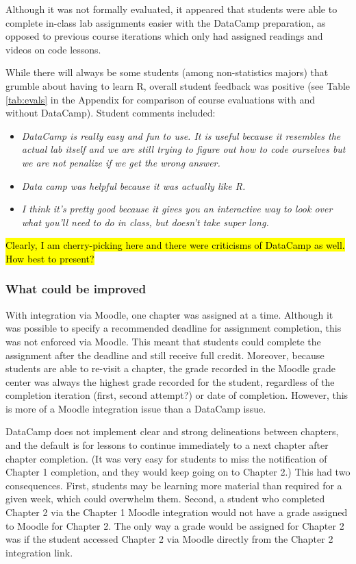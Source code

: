 \documentclass{tise_style_doi}
\begin{document}
Although it was not formally evaluated, it appeared that students were able to complete
in-class lab assignments easier with the DataCamp preparation, as opposed to previous
course iterations which only had assigned readings and videos on code lessons.

While there will always be some students (among non-statistics majors) that grumble about
having to learn R, overall student feedback was positive (see Table \ref{tab:evals}
in the Appendix for comparison of course evaluations with and without DataCamp).
Student comments included:
\begin{itemize}
\item \emph{DataCamp is really easy and fun to use. It is useful because it resembles the actual lab itself and we are still trying to figure out how to code ourselves but we are not penalize if we get the wrong answer.}
\item \emph{Data camp was helpful because it was actually like R.}
\item \emph{I think it's pretty good because it gives you an interactive way to look over what you'll need to do in class, but doesn't take super long. }
\end{itemize}
\hl{Clearly, I am cherry-picking here and there were criticisms of DataCamp as well. 
How best to present?}

\subsubsection{What could be improved}

With integration via Moodle, one chapter was assigned at a time.  Although it
was possible to specify a recommended deadline for assignment completion, this
was not enforced via Moodle.  This meant that students could complete the
assignment after the deadline and still receive full credit.  Moreover,
because students are able to re-visit a chapter, the grade recorded in the Moodle
grade center was always the highest grade recorded for the student, regardless of
the completion iteration (first, second attempt?) or date of completion.  However,
this is more of a Moodle integration issue than a DataCamp issue.

DataCamp does not implement clear and strong delineations between chapters, and the
default is for lessons to continue immediately to a next chapter after chapter
completion.  (It was very easy for students to miss the notification of Chapter 1
completion, and they would keep going on to Chapter 2.)  This had two consequences.
First, students may be learning more material than required for a given week, which
could overwhelm them.  Second, a student who completed Chapter 2 via the Chapter 1
Moodle integration would not have a grade assigned to Moodle for Chapter 2.  The only
way a grade would be assigned for Chapter 2 was if the student accessed Chapter 2 via
Moodle directly from the Chapter 2 integration link.
\end{document}
